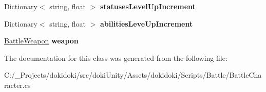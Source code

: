 \begin{DoxyCompactItemize}
\item 
Dictionary$<$ string, float $>$ {\bfseries statuses\+Level\+Up\+Increment}\hypertarget{classdoki_battle_1_1_battle_character_af6d79c2385b2656c7c438e61ec78c74e}{}\label{classdoki_battle_1_1_battle_character_af6d79c2385b2656c7c438e61ec78c74e}

\item 
Dictionary$<$ string, float $>$ {\bfseries abilities\+Leve\+Up\+Increment}\hypertarget{classdoki_battle_1_1_battle_character_a876a4cd5370f4536c569da22173f768b}{}\label{classdoki_battle_1_1_battle_character_a876a4cd5370f4536c569da22173f768b}

\item 
\hyperlink{classdoki_battle_1_1_battle_weapon}{Battle\+Weapon} {\bfseries weapon}\hypertarget{classdoki_battle_1_1_battle_character_a791f01753f0cc112040492cbe448e814}{}\label{classdoki_battle_1_1_battle_character_a791f01753f0cc112040492cbe448e814}

\end{DoxyCompactItemize}


The documentation for this class was generated from the following file\+:\begin{DoxyCompactItemize}
\item 
C\+:/\+\_\+\+Projects/dokidoki/src/doki\+Unity/\+Assets/dokidoki/\+Scripts/\+Battle/Battle\+Character.\+cs\end{DoxyCompactItemize}

